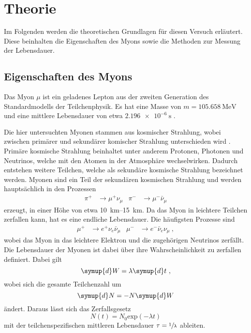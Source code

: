 \section{Theorie}
\label{sec:theorie}

Im Folgenden werden die theoretischen Grundlagen für diesen Versuch erläutert.
Diese beinhalten die Eigenschaften des Myons
sowie die Methoden zur Messung der Lebensdauer.


\subsection{Eigenschaften des Myons}

Das Myon $\mu$ ist ein geladenes Lepton aus der zweiten Generation des Standardmodells der Teilchenphysik.
Es hat eine Masse von $m = \SI{105.658}{\mega\eV}$ und eine mittlere Lebensdauer von etwa $\SI{2,196e-6}{\second}$ \cite{pdg}.

Die hier untersuchten Myonen stammen aus kosmischer Strahlung,
wobei zwischen primärer und sekundärer komischer Strahlung unterschieden wird \cite{grupen}.
Primäre kosmische Strahlung beinhaltet unter anderem Protonen,
Photonen und Neutrinos,
welche mit den Atomen in der Atmosphäre wechselwirken.
Dadurch entstehen weitere Teilchen,
welche als sekundäre kosmische Strahlung bezeichnet werden.
Myonen sind ein Teil der sekundären kosmischen Strahlung und werden hauptsächlich in den Prozessen
\begin{align*}
    \pi^{+} &\to \mu^{+}     \nu_{\mu} &
    \pi^{-} &\to \mu^{-} \bar\nu_{\mu}
\end{align*}
erzeugt,
in einer Höhe von etwa \SIrange{10}{15}{\kilo\meter}.
Da das Myon in leichtere Teilchen zerfallen kann,
hat es eine endliche Lebensdauer.
Die häufigsten Prozesse sind
\begin{align*}
    \mu^{+} &\to e^{+}     \nu_{e} \bar\nu_{\mu} &
    \mu^{-} &\to e^{-} \bar\nu_{e}     \nu_{\mu} \ ,
\end{align*}
wobei das Myon in das leichtere Elektron und die zugehörigen Neutrinos zerfällt.
Die Lebensdauer der Myonen ist dabei über ihre Wahrscheinlichkeit zu zerfallen definiert.
Dabei gilt
\begin{equation*}
    \symup{d}W = \lambda \symup{d}t \ ,
\end{equation*}
wobei sich die gesamte Teilchenzahl um
\begin{equation*}
    \symup{d}N = -N \symup{d}W
\end{equation*}
ändert.
Daraus lässt sich das Zerfallsgesetz
\begin{equation*}
    N(t) = N_0 \text{exp}(- \lambda t)
\end{equation*}
mit der teilchenspezifischen mittleren Lebensdauer $\tau = \sfrac{1}{\lambda}$ ableiten.


